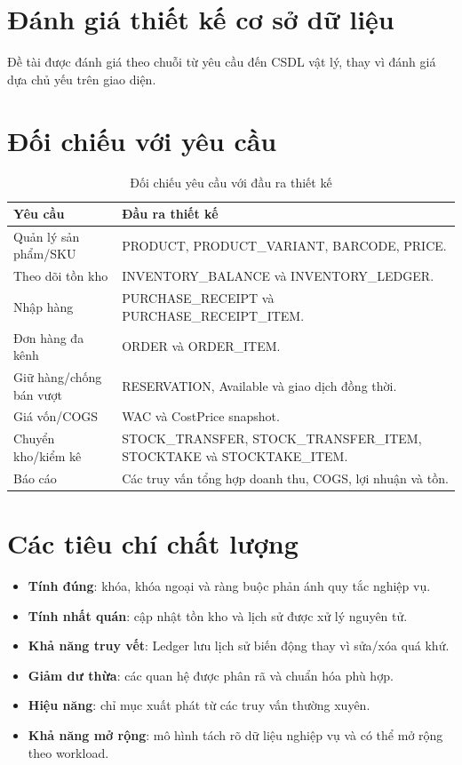 \section{Đánh giá thiết kế cơ sở dữ liệu}

Đề tài được đánh giá theo chuỗi từ yêu cầu đến CSDL vật lý, thay vì đánh giá dựa chủ yếu trên giao diện.

\section{Đối chiếu với yêu cầu}

\begin{table}[H]
\centering
\caption{Đối chiếu yêu cầu với đầu ra thiết kế}
\begin{tabular}{|p{}|p{}|}
\hline
\textbf{Yêu cầu} & \textbf{Đầu ra thiết kế} \\
\hline
Quản lý sản phẩm/SKU & PRODUCT, PRODUCT\_VARIANT, BARCODE, PRICE. \\
\hline
Theo dõi tồn kho & INVENTORY\_BALANCE và INVENTORY\_LEDGER. \\
\hline
Nhập hàng & PURCHASE\_RECEIPT và PURCHASE\_RECEIPT\_ITEM. \\
\hline
Đơn hàng đa kênh & ORDER và ORDER\_ITEM. \\
\hline
Giữ hàng/chống bán vượt & RESERVATION, Available và giao dịch đồng thời. \\
\hline
Giá vốn/COGS & WAC và CostPrice snapshot. \\
\hline
Chuyển kho/kiểm kê & STOCK\_TRANSFER, STOCK\_TRANSFER\_ITEM, STOCKTAKE và STOCKTAKE\_ITEM. \\
\hline
Báo cáo & Các truy vấn tổng hợp doanh thu, COGS, lợi nhuận và tồn. \\
\hline
\end{tabular}
\end{table}

\section{Các tiêu chí chất lượng}

\begin{itemize}
    \item \textbf{Tính đúng}: khóa, khóa ngoại và ràng buộc phản ánh quy tắc nghiệp vụ.
    \item \textbf{Tính nhất quán}: cập nhật tồn kho và lịch sử được xử lý nguyên tử.
    \item \textbf{Khả năng truy vết}: Ledger lưu lịch sử biến động thay vì sửa/xóa quá khứ.
    \item \textbf{Giảm dư thừa}: các quan hệ được phân rã và chuẩn hóa phù hợp.
    \item \textbf{Hiệu năng}: chỉ mục xuất phát từ các truy vấn thường xuyên.
    \item \textbf{Khả năng mở rộng}: mô hình tách rõ dữ liệu nghiệp vụ và có thể mở rộng theo workload.
\end{itemize}

